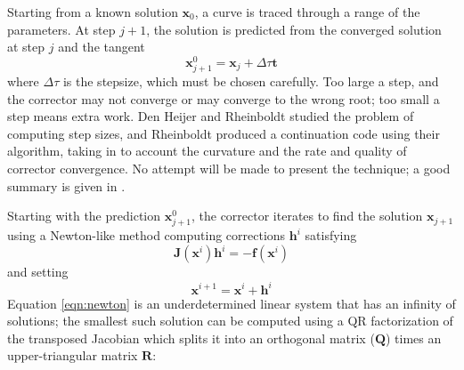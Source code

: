\documentclass[11pt,openany,twoside]{book}
\numberwithin{equation}{section}		%
\newcommand{\Matrix}[1]{\boldsymbol{#1}}
\newcommand{\Vector}[1]{\boldsymbol{#1}}
\newcommand{\Step}{\Delta\tau}
\begin{document}
\par
Starting from a known solution $\Vector{x}_0$, a curve is traced through a range
of the parameters.
At step $j+1$, the solution is predicted from the converged solution
at step $j$ and the tangent
\begin{equation}\label{eqn:predictor}
\Vector{x}_{j+1}^{0} = \Vector{x}_{j} + \Step\Vector{t}
\end{equation}
where $\Step$ is the stepsize, which must be chosen carefully.
Too large a step, and the corrector may not converge or may converge
to the wrong root; too small a step means extra work.
Den Heijer and Rheinboldt \cite{denheijer1981steplength}
studied the problem of computing
step sizes, and Rheinboldt \cite{rheinboldt1983locally}
produced a continuation code
using their algorithm, taking in to account the curvature
and the rate and quality of corrector convergence.
No attempt will be made to present the technique; a good summary is given
in \cite{rheinboldt1986numerical}.

Starting with the prediction $\Vector{x}_{j+1}^0$,
the corrector iterates to find the solution $\Vector{x}_{j+1}$
using a Newton-like method computing corrections
$\Vector{h}^i$ satisfying
\begin{equation}
\label{eqn:newton}
\Matrix{J}(\Vector{x}^{i})\Vector{h}^i = -\Vector{f}(\Vector{x}^{i})
\end{equation}
and setting
\begin{equation}
\Vector{x}^{i+1} = \Vector{x}^{i} + \Vector{h}^i
\end{equation}
Equation \ref{eqn:newton} is an underdetermined linear system that has
an infinity of solutions; the smallest such solution can be computed using
a QR factorization of the transposed Jacobian which splits it into an
orthogonal matrix ($\Matrix{Q}$) times an upper-triangular matrix $\Matrix{R}$:
\end{document}
